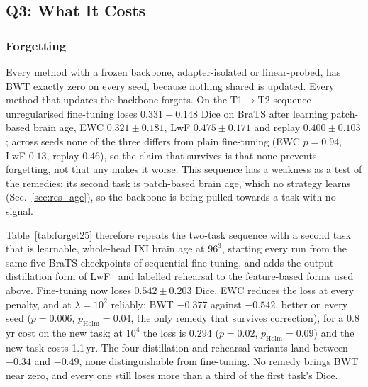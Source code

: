 \iffull\documentclass[journal]{IEEEtran}\else\documentclass[journal,twoside,web]{ieeecolor}\usepackage{generic}\fi
\begin{document}
\subsection{Q3: What It Costs}
\label{sec:res_q3}

\subsubsection{Forgetting}
\label{sec:res_forgetting}

Every method with a frozen backbone, adapter-isolated or linear-probed, has BWT exactly zero on every seed, because nothing shared is updated. Every method that updates the backbone forgets. On the T1$\to$T2 sequence unregularised fine-tuning loses $0.331\pm0.148$ Dice on BraTS after learning patch-based brain age, EWC $0.321\pm0.181$, LwF $0.475\pm0.171$ and replay $0.400\pm0.103$; across seeds none of the three differs from plain fine-tuning (EWC $p=0.94$, LwF $0.13$, replay $0.46$), so the claim that survives is that none prevents forgetting, not that any makes it worse. This sequence has a weakness as a test of the remedies: its second task is patch-based brain age, which no strategy learns (Sec.~\ref{sec:res_age}), so the backbone is being pulled towards a task with no signal.

Table~\ref{tab:forget25} therefore repeats the two-task sequence with a second task that is learnable, whole-head IXI brain age at $96^3$, starting every run from the same five BraTS checkpoints of sequential fine-tuning, and adds the output-distillation form of LwF~\cite{li2017lwf} and labelled rehearsal to the feature-based forms used above. Fine-tuning now loses $0.542\pm0.203$ Dice. EWC reduces the loss at every penalty, and at $\lambda=10^2$ reliably: BWT $-0.377$ against $-0.542$, better on every seed ($p=0.006$, $p_{\text{Holm}}=0.04$, the only remedy that survives correction), for a 0.8\,yr cost on the new task; at $10^4$ the loss is $0.294$ ($p=0.02$, $p_{\text{Holm}}=0.09$) and the new task costs 1.1\,yr. The four distillation and rehearsal variants land between $-0.34$ and $-0.49$, none distinguishable from fine-tuning. No remedy brings BWT near zero, and every one still loses more than a third of the first task's Dice.
\end{document}
